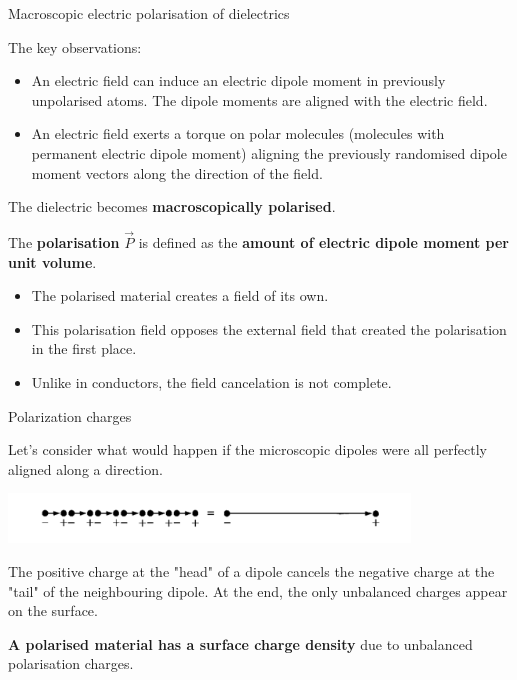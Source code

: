 \begin{frame}{Macroscopic electric polarisation of dielectrics}

The key observations:
\begin{itemize}
 \item An electric field can induce an electric dipole moment in previously unpolarised atoms.
       The dipole moments are aligned with the electric field.
 \item An electric field exerts a torque on polar molecules (molecules with permanent electric
       dipole moment) aligning the previously randomised dipole moment vectors along the
       direction of the field.
\end{itemize}

\vspace{0.2cm}

The dielectric becomes {\bf macroscopically polarised}.\\

\vspace{0.2cm}

The {\bf polarisation} $\vec{P}$ is defined as the
{\bf amount of electric dipole moment per unit volume}.\\

\begin{itemize}
  \item The polarised material creates a field of its own.
  \item This polarisation field opposes the external field that created the polarisation in the first place.
  \item Unlike in conductors, the field cancelation is not complete.
\end{itemize}

\end{frame}

%
%
%

\begin{frame}{Polarization charges}

Let's consider what would happen if the microscopic dipoles were all
perfectly aligned along a direction.

\begin{center}
  \includegraphics[width=0.80\textwidth]{./images/schematics/polarization_charges.png}\\
\end{center}

The positive charge at the "head" of a dipole cancels the negative charge at the "tail"
of the neighbouring dipole. At the end, the only unbalanced charges appear on the surface.

\vspace{0.2cm}

{\bf A polarised material has a surface charge density} due to unbalanced polarisation charges.\\

\end{frame}


